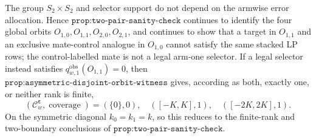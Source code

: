 The group \(S_2\times S_2\) and selector support do not depend on the armwise error allocation. Hence \(\texttt{prop:two-pair-sanity-check}\) continues to identify the four global orbits \(O_{1,0},O_{1,1},O_{2,0},O_{2,1}\), and continues to show that a target in \(O_{1,1}\) and an exclusive mate-control analogue in \(O_{1,0}\) cannot satisfy the same stacked LP rows; the control-labelled mate is not a legal arm-one selector. If a legal selector instead satisfies \(q^{\mathrm{obs}}_{w,1}(O_{1,1})=0\), then \(\texttt{prop:asymmetric-disjoint-orbit-witness}\) gives, according as both, exactly one, or neither rank is finite,
\[
(\mathcal C^{\boldsymbol\varepsilon}_w,\operatorname{coverage})=(\{0\},0),\quad([-K,K],1),\quad([-2K,2K],1).
\]
On the symmetric diagonal \(k_0=k_1=k\), so this reduces to the finite-rank and two-boundary conclusions of \(\texttt{prop:two-pair-sanity-check}\).